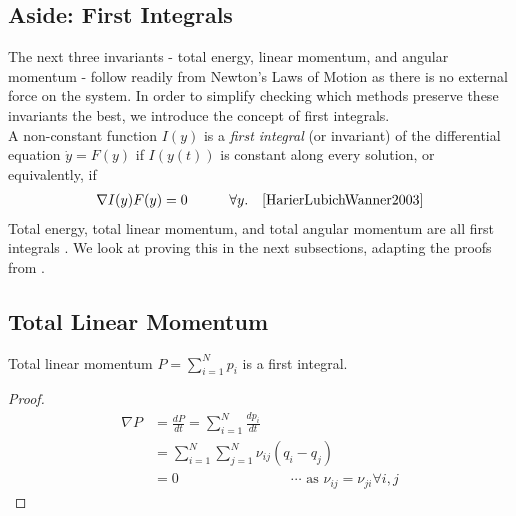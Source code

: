 \documentclass[../Main.tex]{subfiles}
\begin{document}
\subsection*{Aside: First Integrals}
The next three invariants - total energy, linear momentum, and angular momentum - follow readily from Newton's Laws of Motion as there is no external force on the system. In order to simplify checking which methods preserve these invariants the best, we introduce the concept of first integrals. \\
A non-constant function $I(y)$ is a \textit{first integral} (or invariant) of the differential equation $\dot{y} = F(y)$ if $I(y(t))$ is constant along every solution, or equivalently, if
\begin{align}
\nabla I(y)F(y) = 0    \quad \quad \quad  \forall y. \quad \cite{HarierLubichWanner2003} \label{eqn:grad_first_integral_zero}
\end{align}
Total energy, total linear momentum, and total angular momentum are all first integrals \cite{HarierLubichWanner2003}. We look at proving this in the next subsections, adapting the proofs from \cite{HarierLubichWanner2003}.

\subsection{Total Linear Momentum}
 
\begin{theorem} Total linear momentum $P = \sum_{i=1}^{N} p_{i}$ is a first integral. \end{theorem}
\begin{proof}
\begin{align*}
\nabla P & = \frac{dP}{dt} = \sum_{i=1}^{N} \frac{dp_{i}}{dt} \\
&=\sum_{i=1}^{N}\sum_{j=1}^{N}\nu_{ij}\left(q_{i} - q_{j}\right) \\
& = 0 \qquad \qquad \qquad \qquad \cdots \mbox{ as }\nu_{ij} = \nu_{ji} \forall i, j
\end{align*}
\end{proof} 
\end{document}
